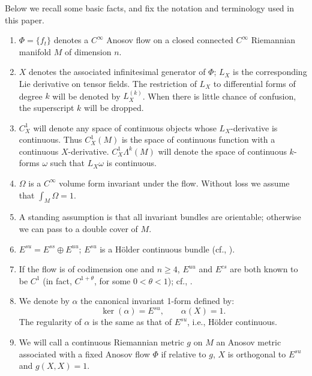 \documentclass[11pt,letterpaper,reqno,abstract=true]{scrartcl}
\theoremstyle{plain}                              %
\theoremstyle{definition}                         %
\theoremstyle{remark}                             %
\begin{document}
Below we recall some basic facts, and fix the notation and terminology
used in this paper.

\begin{enumerate}

\item $\Phi = \{ f_t \}$ denotes a $C^\infty$ Anosov flow on a closed
  connected $C^\infty$ Riemannian manifold $M$ of dimension
  $n$.

\item $X$ denotes the associated infinitesimal generator of $\Phi$;
  $L_X$ is the corresponding Lie derivative on tensor fields. The
  restriction of $L_X$ to differential forms of degree $k$ will be
  denoted by $L_X^{(k)}$. When there is little chance of confusion,
  the superscript $k$ will be dropped.

\item $C^1_X$ will denote any space of continuous objects whose
  $L_X$-derivative is continuous. Thus $C^1_X(M)$ is the space of
  continuous function with a continuous $X$-derivative.
  $C^1_X \Lambda^k(M)$ will denote the space of continuous $k$-forms
  $\omega$ such that $L_X \omega$ is continuous.

\item $\Omega$ is a $C^\infty$ volume form invariant under the
  flow. Without loss we assume that $\int_M \Omega = 1$.

\item A standing assumption is that all invariant bundles are
  orientable; otherwise we can pass to a double cover of
  $M$. 

\item $E^{su} = E^{ss} \oplus E^{uu}$; $E^{su}$ is a H\"older
  continuous bundle (cf., \cite{hassel+94, hassel+97, hps77}).

\item If the flow is of codimension one and $n \geq 4$, $E^{uu}$ and
  $E^{cs}$ are both known to be $C^1$ (in fact, $C^{1 + \theta}$, for
  some $0 < \theta < 1$); cf., \cite{hassel+94, hassel+97, hps77}.

\item We denote by $\alpha$ the canonical invariant 1-form defined by:
  \begin{displaymath}
    \ker(\alpha) = E^{su}, \qquad \alpha(X) = 1.
  \end{displaymath}
  The regularity of $\alpha$ is the same as that of $E^{su}$, i.e.,
  H\"older continuous.

  \item We will call a continuous Riemannian metric $g$ on $M$ an
    \textsf{Anosov metric} associated with a fixed Anosov flow $\Phi$
    if relative to $g$, $X$ is orthogonal to $E^{su}$ and
    $g(X,X) = 1$.


\end{enumerate}
\end{document}
